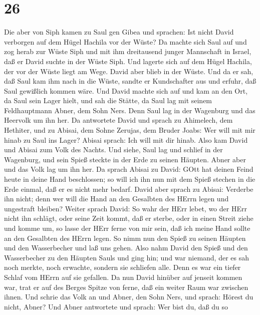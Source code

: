 \hypertarget{section-25}{%
\section{26}\label{section-25}}

 Die aber von Siph kamen zu Saul gen Gibea und sprachen: Ist
nicht David verborgen auf dem Hügel Hachila vor der Wüste? 
Da machte sich Saul auf und zog herab zur Wüste Siph und mit ihm
dreitausend junger Mannschaft in Israel, daß er David suchte in der
Wüste Siph.  Und lagerte sich auf dem Hügel Hachila, der vor
der Wüste liegt am Wege. David aber blieb in der Wüste. Und da er sah,
daß Saul kam ihm nach in die Wüste,  sandte er Kundschafter
aus und erfuhr, daß Saul gewißlich kommen wäre.  Und David
machte sich auf und kam an den Ort, da Saul sein Lager hielt, und sah
die Stätte, da Saul lag mit seinem Feldhauptmann Abner, dem Sohn Ners.
Denn Saul lag in der Wagenburg und das Heervolk um ihn her. 
Da antwortete David und sprach zu Ahimelech, dem Hethiter, und zu
Abisai, dem Sohne Zerujas, dem Bruder Joabs: Wer will mit mir hinab zu
Saul ins Lager? Abisai sprach: Ich will mit dir hinab.  Also
kam David und Abisai zum Volk des Nachts. Und siehe, Saul lag und
schlief in der Wagenburg, und sein Spieß steckte in der Erde zu seinen
Häupten. Abner aber und das Volk lag um ihn her.  Da sprach
Abisai zu David: GOtt hat deinen Feind heute in deine Hand beschlossen;
so will ich ihn nun mit dem Spieß stechen in die Erde einmal, daß er es
nicht mehr bedarf.  David aber sprach zu Abisai: Verderbe
ihn nicht; denn wer will die Hand an den Gesalbten des HErrn legen und
ungestraft bleiben?  Weiter sprach David: So wahr der HErr
lebet, wo der HErr nicht ihn schlägt, oder seine Zeit kommt, daß er
sterbe, oder in einen Streit ziehe und komme um,  so lasse
der HErr ferne von mir sein, daß ich meine Hand sollte an den Gesalbten
des HErrn legen. So nimm nun den Spieß zu seinen Häupten und den
Wasserbecher und laß uns gehen.  Also nahm David den Spieß
und den Wasserbecher zu den Häupten Sauls und ging hin; und war niemand,
der es sah noch merkte, noch erwachte, sondern sie schliefen alle. Denn
es war ein tiefer Schlaf vom HErrn auf sie gefallen.  Da
nun David hinüber auf jenseit kommen war, trat er auf des Berges Spitze
von ferne, daß ein weiter Raum war zwischen ihnen.  Und
schrie das Volk an und Abner, den Sohn Ners, und sprach: Hörest du
nicht, Abner? Und Abner antwortete und sprach: Wer bist du, daß du so
